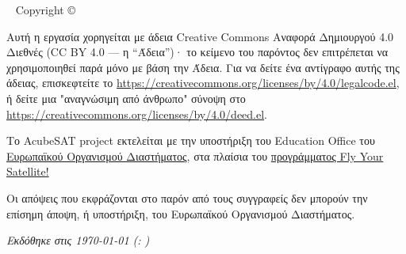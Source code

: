 \documentclass[a4paper,nobib]{tufte-book}
\begin{document}
\makeatother
\maketitle

\newpage
\begin{fullwidth}
~\vfill
\thispagestyle{empty}
\setlength{\parindent}{0pt}
\setlength{\parskip}{\baselineskip}
Copyright \copyright\ \the\year\ \thanklessauthor

\par{}

\par{}

\justify

\par Αυτή η εργασία χορηγείται με άδεια Creative Commons Αναφορά Δημιουργού 4.0 Διεθνές (CC BY 4.0 --- η ``Άδεια'')· το κείμενο του παρόντος δεν επιτρέπεται να χρησιμοποιηθεί παρά μόνο με βάση την Άδεια. Για να δείτε ένα αντίγραφο αυτής της άδειας, επισκεφτείτε το
\url{https://creativecommons.org/licenses/by/4.0/legalcode.el}, ή δείτε μια "αναγνώσιμη από άνθρωπο" σύνοψη στο \url{https://creativecommons.org/licenses/by/4.0/deed.el}.

\par Το AcubeSAT project εκτελείται με την υποστήριξη του Education Office του \href{https://www.esa.int/}{Ευρωπαϊκού Οργανισμού Διαστήματος}, στα πλαίσια του \href{https://www.esa.int/Education/CubeSats_-_Fly_Your_Satellite/}{προγράμματος Fly Your Satellite!}

\par Οι απόψεις που εκφράζονται στο παρόν από τους συγγραφείς δεν μπορούν  την επίσημη άποψη, ή υποστήριξη, του Ευρωπαϊκού Οργανισμού Διαστήματος.

\par\textit{Εκδόθηκε στις {\today{}}  (\texttt{\gitcommit}: \gitcommitmessage)}
\end{fullwidth}

\tableofcontents
\end{document}

